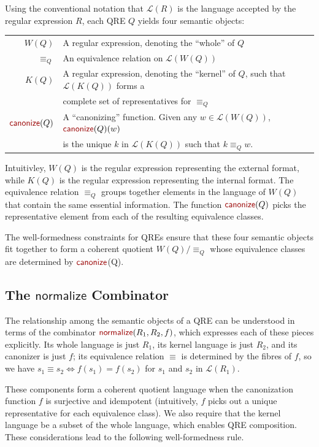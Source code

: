 \documentclass[acmsmall,review,anonymous]{acmart}
\newcommand{\kw}[1]{\textcolor{dkred}{\ensuremath{\mathsf{#1}}}}
\newcommand{\normalize}[3]{\ensuremath{\kw{normalize}(#1, #2, #3)}}
\newcommand{\eqrel}[1]{\ensuremath{\equiv_{#1}}}
\newcommand{\canonize}{\ensuremath{\kw{canonize}}}
\begin{document}
Using the conventional notation that $\mathcal{L}(R)$ is the language accepted
by the regular expression $R$, each QRE $Q$ yields four semantic
objects:

\begin{tabular}{rl}
  $W(Q)$       & A regular expression, denoting the ``whole'' of $Q$\\
  $\eqrel{Q}$  & An equivalence relation on $\mathcal{L}(W(Q))$\\
  $K(Q)$       & A regular expression, denoting the ``kernel'' of $Q$, such that
                  $\mathcal{L}(K(Q))$ forms a \\
               & complete set of representatives for $\eqrel{Q}$ \\
  $\canonize(Q)$ & 
  A ``canonizing'' function. Given any $w \in \mathcal{L}(W(Q))$,
  $\canonize(Q)(w)$ \\ & is the unique $k$ in $\mathcal{L}(K(Q))$ such
  that $k \eqrel{Q} w$.
\end{tabular}

\noindent
Intuitivley, $W(Q)$ is the regular expression representing the
external format, while $K(Q)$ is the regular expression representing
the internal format.  The equivalence relation $\eqrel{Q}$ groups
together elements in the language of $W(Q)$ that contain the same
essential information.  The function $\canonize(Q)$ picks the
representative element from each of the resulting equivalence classes.

The well-formedness constraints for QREs ensure that these four semantic
objects fit together to form a coherent quotient $W(Q)/\eqrel{Q}$ whose
equivalence classes are determined by \canonize(Q).

\subsection{The \kw{normalize} Combinator}

The relationship among the semantic objects of a QRE can be understood in terms
of the combinator \normalize{R_1}{R_2}{f}, which expresses each of these pieces
explicitly.  Its whole language is just $R_1$, its kernel language is just
$R_2$, and its canonizer is just $f$; 
its equivalence relation $\equiv$ is
determined by the fibres of $f$, so we have
$s_1 \equiv s_2 \Leftrightarrow f(s_1) = f(s_2)$ for $s_1$ and $s_2$
in $\mathcal{L}(R_1)$.

These components form a coherent quotient language when the canonization
function $f$ is surjective and idempotent (intuitively, $f$ picks out a unique
representative for each equivalence class).  We also require that the kernel
language be a subset of the whole language, which enables QRE composition.
These considerations lead to the following well-formedness rule.
\end{document}
